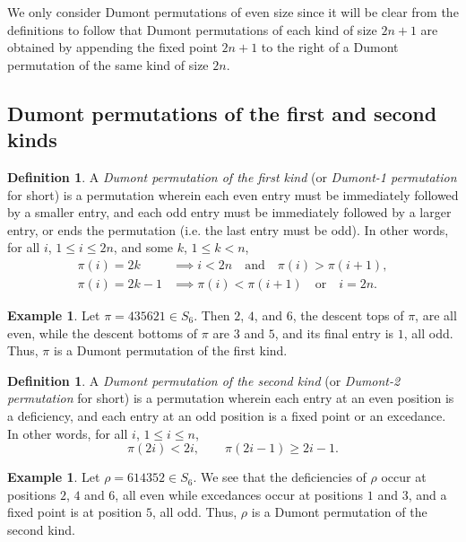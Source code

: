 \documentclass[
final
]{dmtcs-episciences}
\theoremstyle{definition}
\newtheorem{definition}[theorem]{Definition}
\newtheorem{example}[theorem]{Example}
\theoremstyle{remark}
\begin{document}
We only consider Dumont permutations of even size since it will be clear from the definitions to follow that Dumont permutations of each kind of size $2n+1$ are obtained by appending the fixed point $2n+1$ to the right of a Dumont permutation of the same kind of size $2n$.

\subsection{Dumont permutations of the first and second kinds}

\begin{definition}
A \emph{Dumont permutation of the first kind} (or \emph{Dumont-1 permutation} for short) is a permutation wherein each even entry must be immediately followed by a smaller entry, and each odd entry must be immediately followed by a larger entry, or ends the permutation (i.e. the last entry must be odd).  In other words, for all $i$, $1 \leq i \leq 2n$, and some $k$, $1 \leq k < n$,
\begin{align*}
\pi(i) = 2k &\implies i < 2n \quad \text{and} \quad \pi(i) > \pi(i+1), 
\\
\pi(i) = 2k-1 &\implies \pi(i) < \pi (i+1) \quad \text{or} \quad i = 2n.
\end{align*}
\end{definition}

\begin{example}
\label {Dumont Example 1}
Let $\pi = 435621 \in S_6$. Then $2$, $4$, and $6$, the descent tops of $\pi$, are all even, while the descent bottoms of $\pi$ are $3$ and $5$, and its final entry is $1$, all odd.  Thus, $\pi$ is a Dumont permutation of the first kind.
\end{example}

\begin{definition}
A \emph{Dumont permutation of the second kind } (or \emph{Dumont-2 permutation} for short) is a permutation wherein each entry at an even position is a deficiency, and each entry at an odd position is a fixed point or an excedance.  In other words, for all $i$, $1 \leq i \leq n$,
\[
\pi(2i) < 2i, \qquad
\pi(2i-1) \geq 2i-1.
\]
\end{definition}

\begin{example}
\label {Dumont Example 2}
Let $\rho = 614352 \in S_6$. We see that the deficiencies of $\rho$ occur at positions $2$, $4$ and $6$, all even while excedances occur at positions $1$ and $3$, and a fixed point is at position $5$, all odd. Thus, $\rho $ is a Dumont permutation of the second kind.
\end{example}
\end{document}
